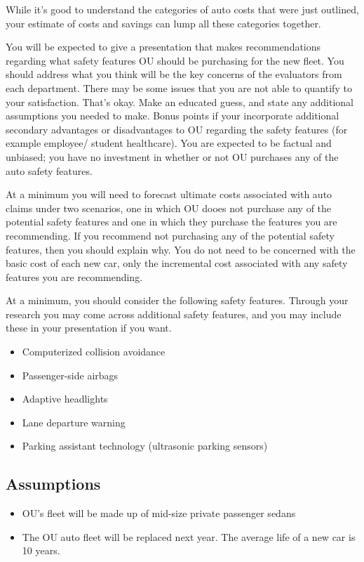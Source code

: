 \documentclass[12pt]{article}
\begin{document}
\medskip\noindent While it's good to understand the categories of auto costs that were just outlined, your estimate of costs and savings can lump all these categories together.

You will be expected to give a presentation that makes recommendations regarding what safety features OU should be purchasing for the new fleet. You should address what you think will be the key concerns of the evaluators from each department. There may be some issues that you are not able to quantify to your satisfaction. That's okay. Make an educated guess, and state any additional assumptions you needed to make. Bonus points if your incorporate additional secondary advantages or disadvantages to OU regarding the safety features (for example employee/ student healthcare). You are expected to be factual and unbiased; you have no investment in whether or not OU purchases any of the auto safety features.

At a minimum you will need to forecast ultimate costs associated with auto claims under two scenarios, one in which OU dooes not purchase any of the potential safety features and one in which they purchase the features you are recommending. If you recommend not purchasing any of the potential safety features, then you should explain why. You do not need to be concerned with the basic cost of each new car, only the incremental cost associated with any safety features you are recommending.

At a minimum, you should consider the following safety features. Through your research you may come across additional safety features, and you may include these in your presentation if you want.
%
\begin{itemize}
\item Computerized collision avoidance
\item Passenger-side airbags
\item Adaptive headlights
\item Lane departure warning
\item Parking assistant technology (ultrasonic parking sensors)
\end{itemize}

\subsection{Assumptions}

\begin{itemize}
\item OU's fleet will be made up of mid-size private passenger sedans
\item The OU auto fleet will be replaced next year. The average life of a new car is 10 years.
\end{itemize}
\end{document}
